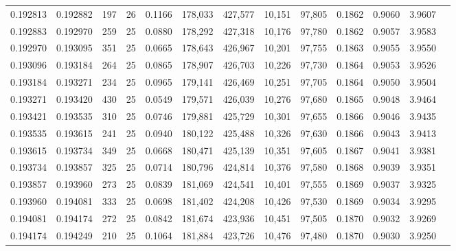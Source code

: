 \begin{tabular}{rrrrrrrrrrrrr}
0.192813 & 0.192882 &   197 &  26 &                                     0.1166 & 178,033 & 427,577 &  10,151 &  97,805 & 0.1862 & 0.9060 & 3.9607 \\
0.192883 & 0.192970 &   259 &  25 &                                     0.0880 & 178,292 & 427,318 &  10,176 &  97,780 & 0.1862 & 0.9057 & 3.9583 \\
0.192970 & 0.193095 &   351 &  25 &                                     0.0665 & 178,643 & 426,967 &  10,201 &  97,755 & 0.1863 & 0.9055 & 3.9550 \\
0.193096 & 0.193184 &   264 &  25 &                                     0.0865 & 178,907 & 426,703 &  10,226 &  97,730 & 0.1864 & 0.9053 & 3.9526 \\
0.193184 & 0.193271 &   234 &  25 &                                     0.0965 & 179,141 & 426,469 &  10,251 &  97,705 & 0.1864 & 0.9050 & 3.9504 \\
0.193271 & 0.193420 &   430 &  25 &                                     0.0549 & 179,571 & 426,039 &  10,276 &  97,680 & 0.1865 & 0.9048 & 3.9464 \\
0.193421 & 0.193535 &   310 &  25 &                                     0.0746 & 179,881 & 425,729 &  10,301 &  97,655 & 0.1866 & 0.9046 & 3.9435 \\
0.193535 & 0.193615 &   241 &  25 &                                     0.0940 & 180,122 & 425,488 &  10,326 &  97,630 & 0.1866 & 0.9043 & 3.9413 \\
0.193615 & 0.193734 &   349 &  25 &                                     0.0668 & 180,471 & 425,139 &  10,351 &  97,605 & 0.1867 & 0.9041 & 3.9381 \\
0.193734 & 0.193857 &   325 &  25 &                                     0.0714 & 180,796 & 424,814 &  10,376 &  97,580 & 0.1868 & 0.9039 & 3.9351 \\
0.193857 & 0.193960 &   273 &  25 &                                     0.0839 & 181,069 & 424,541 &  10,401 &  97,555 & 0.1869 & 0.9037 & 3.9325 \\
0.193960 & 0.194081 &   333 &  25 &                                     0.0698 & 181,402 & 424,208 &  10,426 &  97,530 & 0.1869 & 0.9034 & 3.9295 \\
0.194081 & 0.194174 &   272 &  25 &                                     0.0842 & 181,674 & 423,936 &  10,451 &  97,505 & 0.1870 & 0.9032 & 3.9269 \\
0.194174 & 0.194249 &   210 &  25 &                                     0.1064 & 181,884 & 423,726 &  10,476 &  97,480 & 0.1870 & 0.9030 & 3.9250 \\

\end{tabular}
